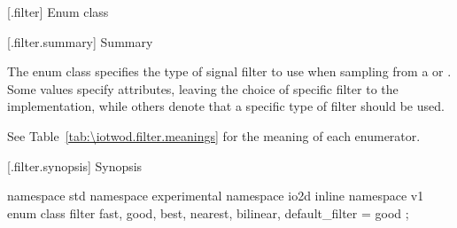  [\iotwod.filter] {Enum class }

 [\iotwod.filter.summary] { Summary}

\pnum
The  enum class specifies the type of signal filter to use when 
sampling from a  or . Some values specify 
attributes, leaving the choice of specific filter to the implementation, while 
others denote that a specific type of filter should be used.

\pnum
See Table~\ref{tab:\iotwod.filter.meanings} for the meaning of each
 enumerator.

 [\iotwod.filter.synopsis] { Synopsis}

\begin{codeblock}
namespace std { namespace experimental { namespace io2d { inline namespace v1 {
  enum class filter {
    fast,
    good,
    best,
    nearest,
    bilinear,
    default_filter = good
  };
} } } }
\end{codeblock}

